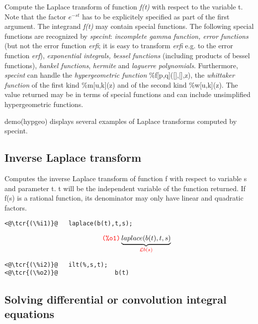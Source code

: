 \documentclass[../Maxima_Workbook.tex]{subfiles}
\begin{document}
\lz Compute the Laplace transform of function \emph{f(t)} with respect to the variable t. Note that the factor $ e^{-st} $ has to be explicitely specified as part of the first argument. The integrand \emph{f(t)} may contain special functions. The following special functions are recognized by \emph{specint}: \emph{incomplete gamma function, error functions} (but not the error function \emph{erfi}; it is easy to transform \emph{erfi} e.g. to the error function \emph{erf}), \emph{exponential integrals, bessel functions} (including products of bessel functions), \emph{hankel functions}, \emph{hermite} and \emph{laguerre polynomials}. Furthermore, \emph{specint} can handle the \emph{hypergeometric function} \%f[p,q]([],[],z), the \emph{whittaker function} of the first kind \%m[u,k](z) and of the second kind \%w[u,k](z). The value returned may be in terms of special functions and can include unsimplified hypergeometric functions.

\lz demo(hypgeo) displays several examples of Laplace transforms computed by specint.

\subsection{Inverse Laplace transform}

\lz {} \hfill \tcr{[function]}

\lz Computes the inverse Laplace transform of function f with respect to variable s and parameter t. t will be the independent variable of the function returned. If f(s) is a rational function, its denominator may only have linear and quadratic factors. 

\lz \begin{small}
\color{blue} \leqn
\begin{lstlisting}
<@\tcr{(\%i1)}@   laplace(b(t),t,s);
\end{lstlisting}
\vspace{-6mm} \[\tag*{\tcr{\ttfamily (\%o1)}} \underbrace{laplace(b(t),t,s)}_{\tcr{\mc{L}b(s)}} \]
\vspace{-7mm} \begin{lstlisting}
<@\tcr{(\%i2)}@   ilt(%,s,t);
<@\tcr{(\%o2)}@			       b(t)
\end{lstlisting}
\color{black} \reqn
\end{small}
\vspace{-2mm} 

\subsection{Solving differential or convolution integral equations}\label{IT1}
\end{document}
